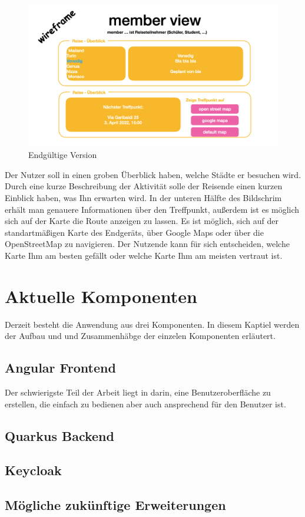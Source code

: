 \begin{figure}[h]
    \centering
    \includegraphics[scale=0.2]{pics/Wireframe.png}
    \caption{Endgültige Version }
    \label{lst:Wireframe}
\end{figure}

Der Nutzer soll in einen groben Überblick haben, welche Städte er besuchen wird. Durch eine kurze Beschreibung der Aktivität solle der Reisende einen kurzen Einblick haben, was Ihn erwarten wird. In der unteren Hälfte des Bildschrim erhält man genauere Informationen über den Treffpunkt, außerdem ist es möglich sich auf der Karte die Route anzeigen zu lassen. Es ist möglich, sich auf der standartmäßigen Karte des Endgeräts, über Google Maps oder über die OpenStreetMap zu navigieren. Der Nutzende kann für sich entscheiden, welche Karte Ihm am besten gefällt oder welche Karte Ihm am meisten vertraut ist. 

\section{Aktuelle Komponenten}
Derzeit besteht die Anwendung aus drei Komponenten. In diesem Kaptiel werden der Aufbau und und Zusammenhäbge der einzelen Komponenten erläutert.  


\subsection{Angular Frontend}

Der schwierigste Teil der Arbeit liegt in darin, eine Benutzeroberfläche zu erstellen, die einfach zu bedienen aber auch ansprechend für den Benutzer ist.


\subsection{Quarkus Backend }

\subsection{Keycloak}

\subsection{Mögliche zukünftige Erweiterungen}


